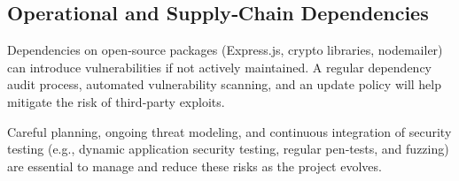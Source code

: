 \subsection{Operational and Supply‑Chain Dependencies}
Dependencies on open‐source packages (Express.js, crypto libraries, nodemailer) can introduce vulnerabilities if not actively maintained. A regular dependency audit process, automated vulnerability scanning, and an update policy will help mitigate the risk of third‐party exploits.

\medskip

Careful planning, ongoing threat modeling, and continuous integration of security testing (e.g., dynamic application security testing, regular pen‐tests, and fuzzing) are essential to manage and reduce these risks as the project evolves.

